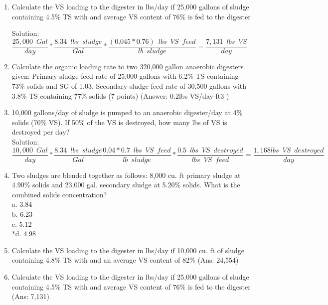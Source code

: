\begin{enumerate}
\item Calculate the VS loading to the digester in lbs/day if 25,000 gallons of sludge containing 4.5\% TS with and average VS content of 76\% is fed to the digester 

Solution:\\
$\dfrac{25,000 \enspace Gal}{day}*\dfrac{8.34 \enspace lbs \enspace sludge}{Gal}* \dfrac{(0.045*0.76) \enspace lbs \enspace VS \enspace feed}{lb \enspace sludge}=\boxed{\dfrac{7,131 \enspace lbs \enspace VS }{day} } $

\item Calculate the organic loading rate to two 320,000 gallon anaerobic digesters given:
Primary sludge feed rate of 25,000 gallons with 6.2\% TS containing 73\% solids and SG of 1.03.
Secondary sludge feed rate of 30,500 gallons with 3.8\% TS containing 77\% solids (7 points)
(Answer: 0.2lbs VS/day-ft3 ) 

\item 10,000 gallons/day of sludge is pumped to an anaerobic digester/day at 4\% solids (70\% VS).  If 50\% of the VS is destroyed, how many lbs of VS is destroyed per day?\\
Solution:\\
$\dfrac{10,000 \enspace Gal}{day}*\dfrac{8.34 \enspace lbs \enspace sludge}{Gal} \dfrac{0.04*0.7 \enspace lbs \enspace VS \enspace feed}{lb \enspace sludge}*\dfrac{0.5 \enspace lbs \enspace VS \enspace destroyed}{lbs \enspace VS \enspace feed}=\boxed{\dfrac{1,168lbs \enspace VS \enspace destroyed}{day} } $

\item  Two sludges are blended together as follows: 8,000 cu. ft primary sludge at 4.90\% solids and 23,000 gal. secondary sludge at 5.20\% solids. What is the combined solids concentration?\\


a. 3.84 \\
b. 6.23 \\
c. 5.12 \\
*d. 4.98 \\

\item  Calculate the VS loading to the digester in lbs/day if 10,000 cu. ft of sludge containing 4.8\% TS with and an average VS content of 82\% (Ans: 24,554)\\

\item  Calculate the VS loading to the digester in lbs/day if 25,000 gallons of sludge containing 4.5\% TS with and average VS content of 76\% is fed to the digester (Ans: 7,131)\\


\end{enumerate}
